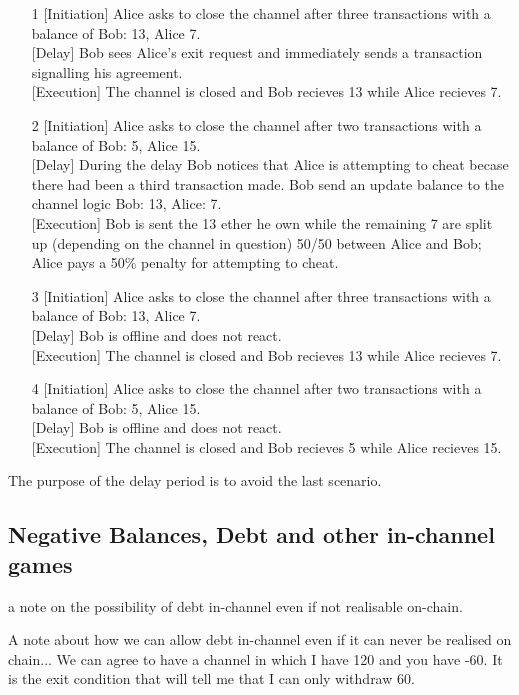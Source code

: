  \begin{enumerate}
  \item[1] {[Initiation] Alice asks to close the channel after three transactions with a balance of Bob: 13, Alice 7. \\
	   {[}Delay] Bob sees Alice's exit request and immediately sends a transaction signalling his agreement. \\
	   {[}Execution] The channel is closed and Bob recieves 13 while Alice recieves 7.}
  \item[2] {[Initiation] Alice asks to close the channel after two transactions with a balance of Bob: 5, Alice 15.\\
	   {[}Delay] During the delay Bob notices that Alice is attempting to cheat becase there had been a third transaction made. Bob send an update balance to the channel logic Bob: 13, Alice: 7.\\
	   {[}Execution] Bob is sent the 13 ether he own while the remaining 7 are split up (depending on the channel in question) 50/50 between Alice and Bob; Alice pays a 50\% penalty for attempting to cheat.}
  \item[3] {[Initiation] Alice asks to close the channel after three transactions with a balance of Bob: 13, Alice 7.\\
	   {[}Delay] Bob is offline and does not react. \\
	   {[}Execution] The channel is closed and Bob recieves 13 while Alice recieves 7.}
  \item[4] {[Initiation] Alice asks to close the channel after two transactions with a balance of Bob: 5, Alice 15.\\
	   {[}Delay] Bob is offline and does not react.\\
	   {[}Execution] The channel is closed and Bob recieves 5 while Alice recieves 15.}
 \end{enumerate}

 The purpose of the delay period is to avoid the last scenario.
 
\subsection{Negative Balances, Debt and other in-channel games}
a note on the possibility of debt in-channel even if not realisable on-chain.

A note about how we can allow debt in-channel even if it can never be realised on chain... We can agree to have a channel in which I have 120 and you have -60. It is the exit condition that will tell me that I can only withdraw 60.


